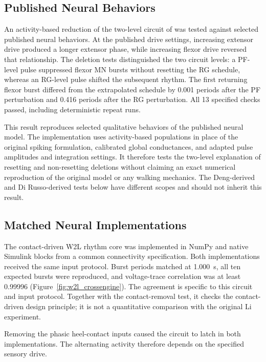 \subsection{Published Neural Behaviors}\label{sec:sns_published_behaviors}

An activity-based reduction of the two-level circuit of \citet{rybak_modelling_2006} was tested against selected published neural behaviors. At the published drive settings, increasing extensor drive produced a longer extensor phase, while increasing flexor drive reversed that relationship. The deletion tests distinguished the two circuit levels: a PF-level pulse suppressed flexor MN bursts without resetting the RG schedule, whereas an RG-level pulse shifted the subsequent rhythm. The first returning flexor burst differed from the extrapolated schedule by 0.001 periods after the PF perturbation and 0.416 periods after the RG perturbation. All 13 specified checks passed, including deterministic repeat runs.

This result reproduces selected qualitative behaviors of the published neural model. The implementation uses activity-based populations in place of the original spiking formulation, calibrated global conductances, and adapted pulse amplitudes and integration settings. It therefore tests the two-level explanation of resetting and non-resetting deletions without claiming an exact numerical reproduction of the original model or any walking mechanics. The Deng-derived and Di Russo-derived tests below have different scopes and should not inherit this result.

\subsection{Matched Neural Implementations}\label{sec:crossengine_results}

The contact-driven W2L rhythm core was implemented in NumPy and native Simulink blocks from a common connectivity specification. Both implementations received the same input protocol. Burst periods matched at \qty{1.000}{\second}, all ten expected bursts were reproduced, and voltage-trace correlation was at least 0.99996 (Figure~\ref{fig:w2l_crossengine}). The agreement is specific to this circuit and input protocol. Together with the contact-removal test, it checks the contact-driven design principle; it is not a quantitative comparison with the original Li experiment.

Removing the phasic heel-contact inputs caused the circuit to latch in both implementations. The alternating activity therefore depends on the specified sensory drive.

